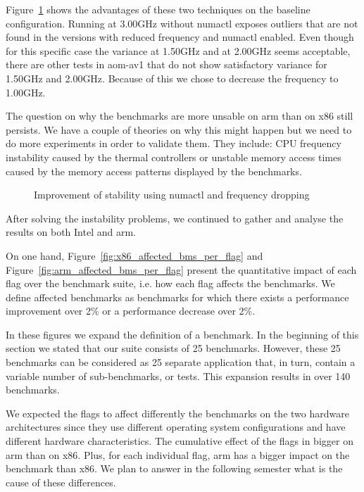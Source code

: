 Figure~\ref{fig:EncoderModeSpeed11RealtimeInputBosphorus4K} shows the advantages
of these two techniques on the baseline configuration. Running at 3.00GHz
without numactl exposes outliers that are not found in the versions with reduced
frequency and numactl enabled. Even though for this specific case the variance
at 1.50GHz and at 2.00GHz seems acceptable, there are other tests in aom-av1
that do not show satisfactory variance for 1.50GHz and 2.00GHz. Because of this
we chose to decrease the frequency to 1.00GHz.

The question on why the benchmarks are more unsable on arm than on x86 still
persists. We have a couple of theories on why this might happen but we need to
do more experiments in order to validate them. They include: CPU frequency
instability caused by the thermal controllers or unstable memory access times
caused by the memory access patterns displayed by the benchmarks. 

\begin{figure}[H]
  \centering
  
  \caption{Improvement of stability using numactl and frequency dropping}
  \label{fig:EncoderModeSpeed11RealtimeInputBosphorus4K}
\end{figure}

After solving the instability problems, we continued to gather and analyse the
results on both Intel and arm.

On one hand, Figure~\ref{fig:x86_affected_bms_per_flag} and
Figure~\ref{fig:arm_affected_bms_per_flag} present the quantitative impact of
each flag over the benchmark suite, i.e. how each flag affects the benchmarks.
We define affected benchmarks as benchmarks for which there exists a performance
improvement over 2\% or a performance decrease over 2\%.

In these figures we expand the definition of a benchmark. In the beginning of
this section we stated that our suite consists of 25 benchmarks. However, these
25 benchmarks can be considered as 25 separate application that, in turn,
contain a variable number of sub-benchmarks, or tests. This expansion results in
over 140 benchmarks.

We expected the flags to affect differently the benchmarks on the two hardware
architectures since they use different operating system configurations and have
different hardware characteristics. The cumulative effect of the flags in bigger
on arm than on x86. Plus, for each individual flag, arm has a bigger impact on
the benchmark than x86. We plan to answer in the following semester what is the
cause of these differences.

